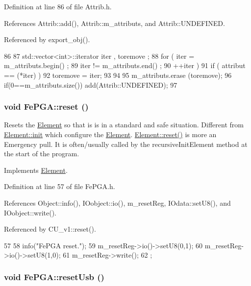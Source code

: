 Definition at line 86 of file Attrib.h.

References Attrib::add(), Attrib::m\_\-attributs, and Attrib::UNDEFINED.

Referenced by export\_\-obj().


\begin{DoxyCode}
86                                {
87     std::vector<int>::iterator iter , toremove ;
88     for ( iter  = m_attributs.begin() ;
89           iter != m_attributs.end()   ;
90           ++iter ) {
91       if ( attribut == (*iter) ) {
92         toremove = iter;
93       }
94     }
95     m_attributs.erase (toremove);
96     if(0==m_attributs.size()) add(Attrib::UNDEFINED);
97   }
\end{DoxyCode}
\hypertarget{classFePGA_abdf7a9dd901351a7eafd748d35172a3c}{
\subsubsection[{reset}]{\setlength{\rightskip}{0pt plus 5cm}void FePGA::reset ()}}
\label{classFePGA_abdf7a9dd901351a7eafd748d35172a3c}
Resets the \hyperlink{classElement}{Element} so that is is in a standard and safe situation. Different from \hyperlink{classElement_af42754b5cabc198869222725218d695c}{Element::init} which configure the \hyperlink{classElement}{Element}. \hyperlink{classElement_a69efffa22f06909d768149715565cb56}{Element::reset()} is more an Emergency pull. It is often/usually called by the recursiveInitElement method at the start of the program. 

Implements \hyperlink{classElement_a69efffa22f06909d768149715565cb56}{Element}.

Definition at line 57 of file FePGA.h.

References Object::info(), IOobject::io(), m\_\-resetReg, IOdata::setU8(), and IOobject::write().

Referenced by CU\_\-v1::reset().


\begin{DoxyCode}
57                {
58     info("FePGA reset.");
59     m_resetReg->io()->setU8(0,1);
60     m_resetReg->io()->setU8(1,0);
61     m_resetReg->write();
62   };
\end{DoxyCode}
\hypertarget{classFePGA_a79d95b2fccf4d2ea473e6cf6980d6cf6}{
\subsubsection[{resetUsb}]{\setlength{\rightskip}{0pt plus 5cm}void FePGA::resetUsb ()}}
\label{classFePGA_a79d95b2fccf4d2ea473e6cf6980d6cf6}


